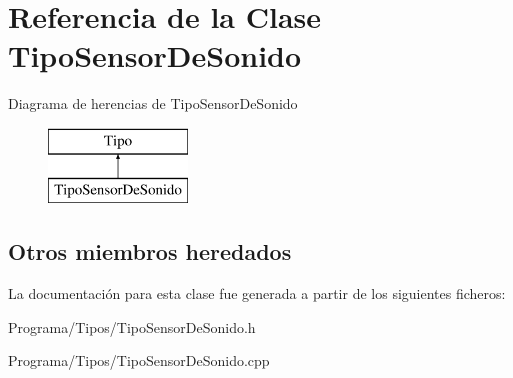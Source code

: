 \hypertarget{class_tipo_sensor_de_sonido}{\section{Referencia de la Clase Tipo\-Sensor\-De\-Sonido}
\label{class_tipo_sensor_de_sonido}
}
Diagrama de herencias de Tipo\-Sensor\-De\-Sonido\begin{figure}[H]
\begin{center}
\leavevmode
\includegraphics[height=2.000000cm]{class_tipo_sensor_de_sonido}
\end{center}
\end{figure}
\subsection*{Otros miembros heredados}


La documentación para esta clase fue generada a partir de los siguientes ficheros\-:\begin{DoxyCompactItemize}
\item 
Programa/\-Tipos/Tipo\-Sensor\-De\-Sonido.\-h\item 
Programa/\-Tipos/Tipo\-Sensor\-De\-Sonido.\-cpp\end{DoxyCompactItemize}
